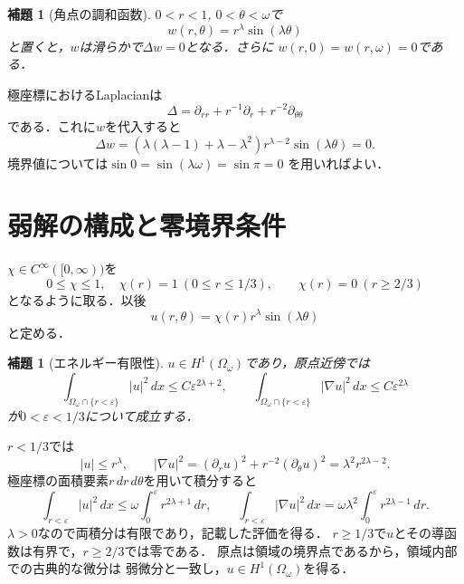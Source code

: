 \documentclass[a5paper,10pt,onecolumn]{jsarticle}
\makeatletter
\theoremstyle{mathnotetheorem}
\newtheorem{lemma}[theorem]{補題}
\renewcommand{\proofname}{証明}
\renewenvironment{proof}[1][\proofname]{%
  \par\pushQED{\qed}\normalfont\topsep4\p@\@plus2\p@\relax
  \trivlist\item[\hskip\labelsep\bfseries #1]\ignorespaces
}{\popQED\endtrivlist\@endpefalse}
\makeatother
\begin{document}
\begin{lemma}[角点の調和函数]\label{lem:harmonic}
$0<r<1$, $0<\theta<\omega$で
\[
 w(r,\theta)=r^\lambda\sin(\lambda\theta)
\]
と置くと，$w$は滑らかで$\Delta w=0$となる．さらに
$w(r,0)=w(r,\omega)=0$である．
\end{lemma}
\begin{proof}
極座標におけるLaplacianは
\[
 \Delta=\partial_{rr}+r^{-1}\partial_r+r^{-2}\partial_{\theta\theta}
\]
である．これに$w$を代入すると
\[
 \Delta w=(\lambda(\lambda-1)+\lambda-\lambda^2)
 r^{\lambda-2}\sin(\lambda\theta)=0.
\]
境界値については$\sin0=\sin(\lambda\omega)=\sin\pi=0$
を用いればよい．
\end{proof}

\section{弱解の構成と零境界条件}
$\chi\in C^\infty([0,\infty))$を
\[
 0\le\chi\le1,\quad
 \chi(r)=1\ (0\le r\le1/3),\qquad
 \chi(r)=0\ (r\ge2/3)
\]
となるように取る．以後
\[
 u(r,\theta)=\chi(r)r^\lambda\sin(\lambda\theta)
\]
と定める．

\begin{lemma}[エネルギー有限性]\label{lem:H1}
$u\in H^1(\Omega_\omega)$であり，原点近傍では
\[
 \int_{\Omega_\omega\cap\{r<\varepsilon\}}|u|^2\,dx
      \le C\varepsilon^{2\lambda+2},\qquad
 \int_{\Omega_\omega\cap\{r<\varepsilon\}}|\nabla u|^2\,dx
      \le C\varepsilon^{2\lambda}
\]
が$0<\varepsilon<1/3$について成立する．
\end{lemma}
\begin{proof}
$r<1/3$では
\[
 |u|\le r^\lambda,\qquad
 |\nabla u|^2=(\partial_r u)^2+r^{-2}(\partial_\theta u)^2
             =\lambda^2r^{2\lambda-2}.
\]
極座標の面積要素$r\,dr\,d\theta$を用いて積分すると
\[
 \int_{r<\varepsilon}|u|^2\,dx
   \le\omega\int_0^\varepsilon r^{2\lambda+1}\,dr,
 \qquad
 \int_{r<\varepsilon}|\nabla u|^2\,dx
   =\omega\lambda^2\int_0^\varepsilon r^{2\lambda-1}\,dr.
\]
$\lambda>0$なので両積分は有限であり，記載した評価を得る．
$r\ge1/3$で$u$とその導函数は有界で，$r\ge2/3$では零である．
原点は領域の境界点であるから，領域内部での古典的な微分は
弱微分と一致し，$u\in H^1(\Omega_\omega)$を得る．
\end{proof}
\end{document}
